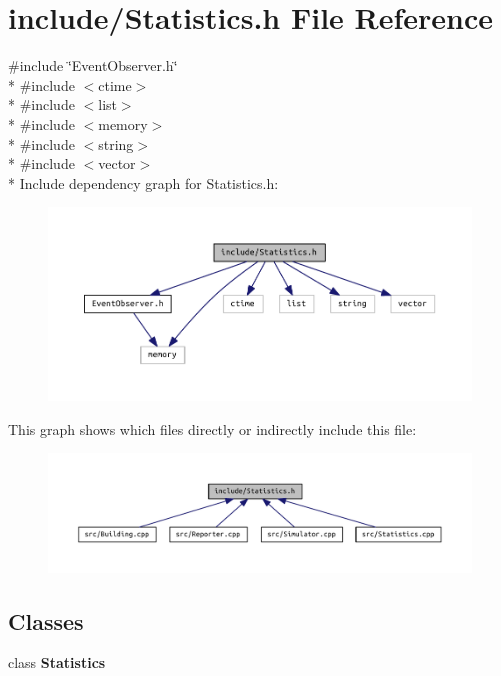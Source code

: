 \section{include/\+Statistics.h File Reference}
\label{_statistics_8h}
{\ttfamily \#include \char`\"{}Event\+Observer.\+h\char`\"{}}\\*
{\ttfamily \#include $<$ctime$>$}\\*
{\ttfamily \#include $<$list$>$}\\*
{\ttfamily \#include $<$memory$>$}\\*
{\ttfamily \#include $<$string$>$}\\*
{\ttfamily \#include $<$vector$>$}\\*
Include dependency graph for Statistics.\+h\+:\nopagebreak
\begin{figure}[H]
\begin{center}
\leavevmode
\includegraphics[width=350pt]{_statistics_8h__incl}
\end{center}
\end{figure}
This graph shows which files directly or indirectly include this file\+:\nopagebreak
\begin{figure}[H]
\begin{center}
\leavevmode
\includegraphics[width=350pt]{_statistics_8h__dep__incl}
\end{center}
\end{figure}
\subsection*{Classes}
\begin{DoxyCompactItemize}
\item 
class {\bf Statistics}
\end{DoxyCompactItemize}
